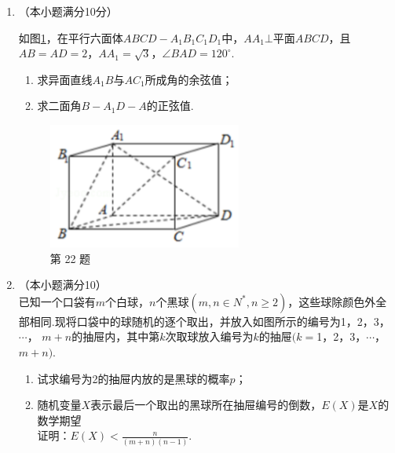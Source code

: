 \documentclass[12pt,space]{ctexart} %
\begin{document}
\begin{enumerate}[itemsep=-0.3em,topsep=0pt,resume]
  \item （本小题满分10分）\\[0.5em]
    \begin{minipage}[h][20ex][t]{.63\textwidth}
      如图\ref{fig:t22}，在平行六面体$ABCD-A_1B_1C_1D_1$中，$AA_1\bot $平面$ABCD$，且$AB=AD=2$，$AA_1=\sqrt{3}$，$\angle BAD=120^{\circ}$.
      \begin{enumerate}[itemsep=-0.3em,label={(\arabic*)},topsep=0pt,labelsep=.5em,leftmargin=1.7em]
        \item 求异面直线$A_1B$与$AC_1$所成角的余弦值；
        \item 求二面角$B-A_1D-A$的正弦值.
      \end{enumerate}
    \end{minipage}
    \begin{minipage}[h][20ex][b]{.35\textwidth}
      \begin{figure}[H]
        \centering
        \includegraphics[width=0.6\textwidth]{Image/js-22.png}
        \caption{第 22 题}\label{fig:t22}
      \end{figure}
    \end{minipage}

  \item （本小题满分10）\\
    已知一个口袋有$m$个白球，$n$个黑球$(m,n\in N^*, n\geq 2)$，这些球除颜色外全部相同.现将口袋中的球随机的逐个取出，并放入如图所示的编号为1，2，3，$\cdots$，
    $m+n$的抽屉内，其中第$k$次取球放入编号为$k$的抽屉$(k=$1，2，3，$\cdots$，$m+n)$.\\
    \begin{enumerate}[itemsep=-0.3em,label={(\arabic*)},topsep=0pt,labelsep=.5em,leftmargin=1.7em]
      \item 试求编号为2的抽屉内放的是黑球的概率$p$；
      \item 随机变量$X$表示最后一个取出的黑球所在抽屉编号的倒数，$E(X)$是$X$的数学期望\\
      证明：$\displaystyle{E(X)<\frac{n}{(m+n)(n-1)}}$.
    \end{enumerate}

\end{enumerate}

\clearpage
\end{document}
